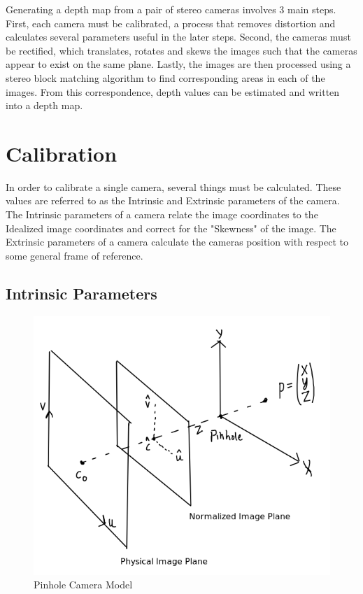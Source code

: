 \thispagestyle{plain}
Generating a depth map from a pair of stereo cameras involves 3 main steps.  First, each camera must be calibrated, a process that removes distortion and calculates several parameters useful in the later steps.  Second, the cameras must be rectified, which translates, rotates and skews the images such that the cameras appear to exist on the same plane.  Lastly, the images are then processed using a stereo block matching algorithm to find corresponding areas in each of the images.  From this correspondence, depth values can be estimated and written into a depth map.

\section{Calibration}
In order to calibrate a single camera, several things must be calculated.  These values are referred to as the Intrinsic and Extrinsic parameters of the camera.  The Intrinsic parameters of a camera relate the image coordinates to the Idealized image coordinates and correct for the "Skewness" of the image. The Extrinsic parameters of a camera calculate the cameras position with respect to some general frame of reference.


\subsection{Intrinsic Parameters}

\begin{figure}[h!]
  \includegraphics[scale=.5]{Image1}
  \caption{Pinhole Camera Model}
  \label{fig:Pinhole}
\end{figure}


